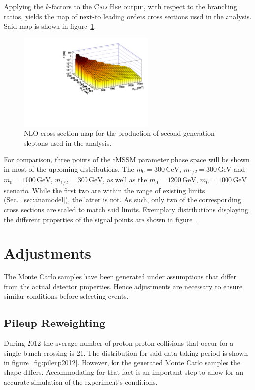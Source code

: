 \noindent Applying the $k$-factors to the \textsc{CalcHep} output, with respect to the branching ratios, yields the map of next-to leading orders cross sections used in the analysis. Said map is shown in figure~\ref{fig:susy-2dxs}.

\begin{figure}[!htb]
  \centering
  \includegraphics[width=0.6\textwidth]{plots/2dxs.pdf}
  \caption{NLO cross section map for the production of second generation sleptons used in the analysis.}
  \label{fig:susy-2dxs}
\end{figure}

For comparison, three points of the cMSSM parameter phase space will be shown in most of the upcoming distributions. The $m_0 = 300\,\text{GeV}$, $m_{1/2} = 300\,\text{GeV}$ and $m_0 = 1000\,\text{GeV}$, $m_{1/2} = 300\,\text{GeV}$, as well as the $m_0 = 1200\,\text{GeV}$, $m_0 = 1000\,\text{GeV}$ scenario. While the first two are within the range of existing limits (Sec.~\ref{sec:anamodel}), the latter is not. As such, only two of the corresponding cross sections are scaled to match said limits. Exemplary distributions displaying the different properties of the signal points are shown in figure~.


\section{Adjustments}

The Monte Carlo samples have been generated under assumptions that differ from the actual detector properties. Hence adjustments are necessary to ensure similar conditions before selecting events.


\subsection{Pileup Reweighting}
\label{sec:pileup}

During 2012 the average number of proton-proton collisions that occur for a single bunch-crossing is 21. The distribution for said data taking period is shown in figure~\ref{fig:pileup2012}. However, for the generated Monte Carlo samples the shape differs. Accommodating for that fact is an important step to allow for an accurate simulation of the experiment's conditions.

